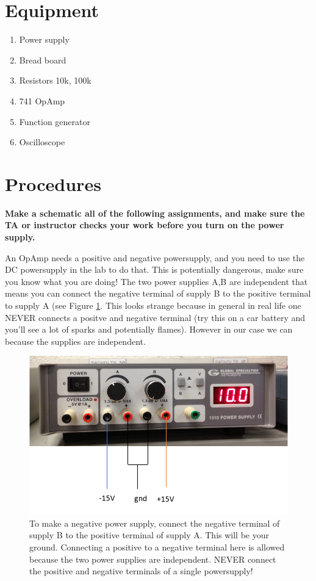 \documentclass[11pt,letterpaper]{article}
\begin{document}
\section{Equipment}

\begin{enumerate}
\item Power supply
\item Bread board
\item Resistors 10k, 100k
\item 741 OpAmp
\item Function generator
\item Oscilloscope
\end{enumerate}

\section{Procedures}

\textbf{Make a schematic all of the following assignments, and make sure the TA or instructor checks your work before you turn on the power supply.}

An OpAmp needs a positive and negative powersupply, and you need to use the DC powersupply in the lab to do that. This is potentially dangerous, make sure you know what you are doing! The two power supplies A,B are independent that means you can connect the negative terminal of supply B to the positive terminal to supply A (see Figure \ref{fig:Lab5_NegativePowerSupply}. This looks strange because in general in real life one NEVER connects a positve and negative terminal (try this on a car battery and you'll see a lot of sparks and potentially flames). However in our case we can because the supplies are independent.

\begin{figure}
\centering
\includegraphics[width=0.8\linewidth]{Lab5_NegativePowerSupply}
\caption{To make a negative power supply, connect the negative terminal of supply B to the positive terminal of supply A. This will be your ground. Connecting a positive to a negative terminal here is allowed because the two power supplies are independent. NEVER connect the positive and negative terminals of a single powersupply!}
\label{fig:Lab5_NegativePowerSupply}
\end{figure}
\end{document}
